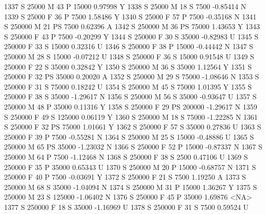 \documentclass{article}
\begin{document}
\begin{Schunk}
\begin{Soutput}
1337      S      25000   M  43         P  15000   0.97998    Y
1338      S      25000   M  18         S   7500  -0.85414    N
1339      S      25000   F  36         P   7500   1.58486    Y
1340      S      25000   F  57         P   7500  -0.35168    N
1341      S     250000   M  21        PS   7500   0.62396    A
1342      S     250000   M  36        PS  75000   1.43653    Y
1343      S     250000   F  43         P   7500  -0.20299    Y
1344      S     250000   F  30         S  35000  -0.82983    U
1345      S     250000   F  33         S  15000   0.32316    U
1346      S     250000   F  38         P  15000  -0.44442    N
1347      S     250000   M  28         S  15000  -0.07212    U
1348      S     250000   F  36         S  15000   0.91548    U
1349      S     250000   F  22         S  35000   0.32842    Y
1350      S     250000   M  36         S  35000   1.12564    Y
1351      S     250000   F  32        PS  35000   0.20020    A
1352      S     250000   M  29         S  75000  -1.08646    N
1353      S     250000   F  31         S  75000   0.18242    U
1354      S     250000   M  45         S  75000   1.01395    Y
1355      S     250000   F  38         S  35000  -1.29617    N
1356      S     250000   M  56         S  35000  -0.93647    U
1357      S     250000   M  48         P  35000   0.11316    Y
1358      S     250000   F  29        PS 200000  -1.29617    N
1359      S     250000   F  49         S 125000   0.06119    Y
1360      S     250000   M  18         S  75000  -1.22285    N
1361      S     250000   F  32        PS  75000   1.01661    Y
1362      S     250000   F  57         S  35000   0.27836    U
1363      S     250000   F  39         P   7500  -0.55281    N
1364      S     250000   M  25         S  15000  -0.48886    U
1365      S     250000   M  65        PS  35000  -1.23032    N
1366      S     250000   F  52         P  15000  -0.87337    N
1367      S     250000   M  64         P   7500  -1.12468    N
1368      S     250000   F  38         S   2500   0.47106    U
1369      S     250000   F  35         P  35000   0.65343    U
1370      S     250000   M  20         P  15000  -0.68757    N
1371      S     250000   F  40         P   7500  -0.03691    Y
1372      S     250000   F  21         S   7500   1.19250    A
1373      S     250000   M  68         S  35000  -1.04094    N
1374      S     250000   M  31         P  15000   1.36267    Y
1375      S     250000   M  23         S 125000  -1.06402    N
1376      S     250000   F  45         P  35000   1.69876 <NA>
1377      S     250000   F  18         S  35000  -1.16969    U
1378      S     250000   F  31         S   7500   0.59524    U

\end{Soutput}
\end{Schunk}
\end{document}
